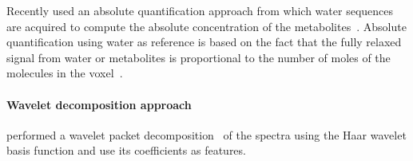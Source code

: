Recently \citeauthor{trigui2017automatic} used an absolute quantification approach from which water sequences are acquired to compute the absolute concentration of the metabolites~\cite{trigui2016classification,trigui2017automatic}.
Absolute quantification using water as reference is based on the fact that the fully relaxed signal from water or metabolites is proportional to the number of moles of the molecules in the voxel~\cite{gasparovic2006use}.

\paragraph{Wavelet decomposition approach} 
\citeauthor{Tiwari2012} performed a wavelet packet decomposition~\cite{Coifman1992} of the spectra using the Haar wavelet basis function and use its coefficients as features.
